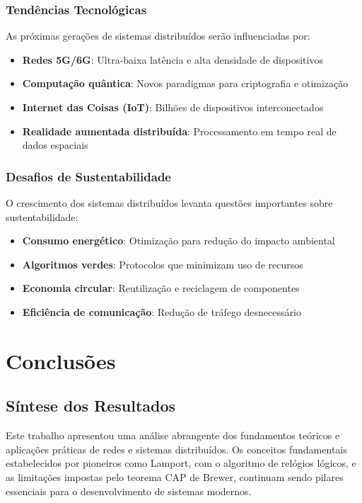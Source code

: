 \subsubsection{Tendências Tecnológicas}

As próximas gerações de sistemas distribuídos serão influenciadas por:

\begin{itemize}
    \item \textbf{Redes 5G/6G}: Ultra-baixa latência e alta densidade de dispositivos
    \item \textbf{Computação quântica}: Novos paradigmas para criptografia e otimização
    \item \textbf{Internet das Coisas (IoT)}: Bilhões de dispositivos interconectados
    \item \textbf{Realidade aumentada distribuída}: Processamento em tempo real de dados espaciais
\end{itemize}

\subsubsection{Desafios de Sustentabilidade}

O crescimento dos sistemas distribuídos levanta questões importantes sobre sustentabilidade:

\begin{itemize}
    \item \textbf{Consumo energético}: Otimização para redução do impacto ambiental
    \item \textbf{Algoritmos verdes}: Protocolos que minimizam uso de recursos
    \item \textbf{Economia circular}: Reutilização e reciclagem de componentes
    \item \textbf{Eficiência de comunicação}: Redução de tráfego desnecessário
\end{itemize}

\section{Conclusões}

\subsection{Síntese dos Resultados}

Este trabalho apresentou uma análise abrangente dos fundamentos teóricos e aplicações práticas de redes e sistemas distribuídos. Os conceitos fundamentais estabelecidos por pioneiros como Lamport, com o algoritmo de relógios lógicos, e as limitações impostas pelo teorema CAP de Brewer, continuam sendo pilares essenciais para o desenvolvimento de sistemas modernos.

